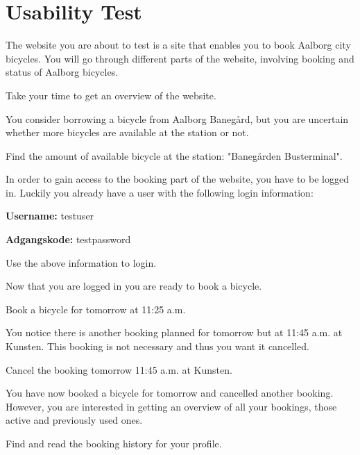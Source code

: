\chapter{Usability Test}\label{app:usability-test}
	The website you are about to test is a site that enables you to book Aalborg city bicycles.
	You will go through different parts of the website, involving booking and status of Aalborg bicycles.
	
	\begin{description}[style=nextline]
		\item[Establish an overview]
			Take your time to get an overview of the website.
		\item[Status for bicycle]
			You consider borrowing a bicycle from Aalborg Banegård, but you are uncertain whether more bicycles are available at the station or not.
		
			Find the amount of available bicycle at the station: "Banegården Busterminal".
		\item[Booking - Login]
			In order to gain access to the booking part of the website, you have to be logged in.
			Luckily you already have a user with the following login information:
			
			\textbf{Username:} testuser
			
			\textbf{Adgangskode:} testpassword
			
			Use the above information to login.
		\item[Booking - Time and booking]
			 Now that you are logged in you are ready to book a bicycle.
			 
			 Book a bicycle for tomorrow at 11:25 a.m.
		\item[Cancel planned booking]
			 You notice there is another booking planned for tomorrow but at 11:45 a.m. at Kunsten.
			 This booking is not necessary and thus you want it cancelled.
			 
			 Cancel the booking tomorrow 11:45 a.m. at Kunsten.
		\item[Examine the booking history]
			You have now booked a bicycle for tomorrow and cancelled another booking.
			However, you are interested in getting an overview of all your bookings, those active and previously used ones.
			
			Find and read the booking history for your profile.
	\end{description}